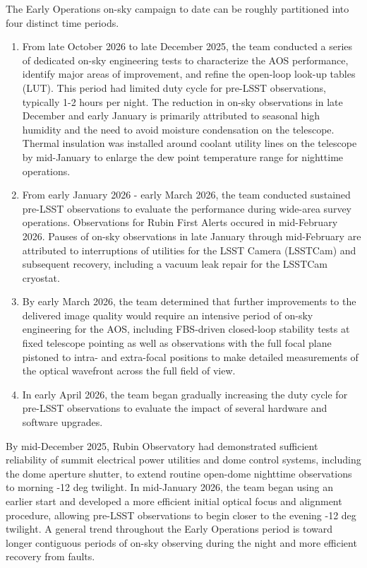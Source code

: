 \documentclass[OPS,lsst,authoryear,toc]{lsstdoc}
\begin{document}
The Early Operations on-sky campaign to date can be roughly partitioned into four distinct time periods.
\begin{enumerate}
  \item From late October 2026 to late December 2025, the team conducted a series of dedicated on-sky engineering tests to characterize the AOS performance, identify major areas of improvement, and refine the open-loop look-up tables (LUT). This period had limited duty cycle for pre-LSST observations, typically 1-2 hours per night. The reduction in on-sky observations in late December and early January is primarily attributed to seasonal high humidity and the need to avoid moisture condensation on the telescope. Thermal insulation was installed around coolant utility lines on the telescope by mid-January to enlarge the dew point temperature range for nighttime operations.
  \item From early January 2026 - early March 2026, the team conducted sustained pre-LSST observations to evaluate the performance during wide-area survey operations. Observations for Rubin First Alerts occured in mid-February 2026. Pauses of on-sky observations in late January through mid-February are attributed to interruptions of utilities for the LSST Camera (LSSTCam) and subsequent recovery, including a vacuum leak repair for the LSSTCam cryostat.
  \item By early March 2026, the team determined that further improvements to the delivered image quality would require an intensive period of on-sky engineering for the AOS, including FBS-driven closed-loop stability tests at fixed telescope pointing as well as observations with the full focal plane pistoned to intra- and extra-focal positions to make detailed measurements of the optical wavefront across the full field of view.
  \item In early April 2026, the team began gradually increasing the duty cycle for pre-LSST observations to evaluate the impact of several hardware and software upgrades.
\end{enumerate}

By mid-December 2025, Rubin Observatory had demonstrated sufficient reliability of summit electrical power utilities and dome control systems, including the dome aperture shutter, to extend routine open-dome nighttime observations to morning -12 deg twilight.
In mid-January 2026, the team began using an earlier start and developed a more efficient initial optical focus and alignment procedure, allowing pre-LSST observations to begin closer to the evening -12 deg twilight.
A general trend throughout the Early Operations period is toward longer contiguous periods of on-sky observing during the night and more efficient recovery from faults.
\end{document}
